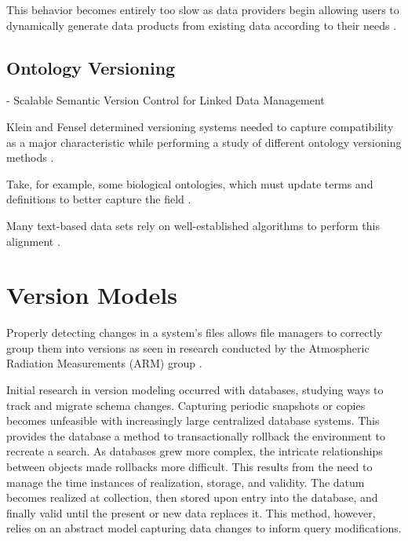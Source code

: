 This behavior becomes entirely too slow as data providers begin allowing users to dynamically generate data products from existing data according to their needs \cite{Barkstrom2003a}.

\subsection{Ontology Versioning}

\cite{HauptmannEtAl:LDQ2015} \cite{LDQ2015} - Scalable Semantic Version Control for Linked Data Management

Klein and Fensel determined versioning systems needed to capture compatibility as a major characteristic while performing a study of different ontology versioning methods \cite{Klein01ontologyversioning}.

Take, for example, some biological ontologies, which must update terms and definitions to better capture the field \cite{Ochs:2015:SVS:2826733.2826866}.

Many text-based data sets rely on well-established algorithms to perform this alignment  \cite{Hartung201315}.

\section{Version Models} \label{sec:models}

Properly detecting changes in a system's files allows file managers to correctly group them into versions as seen in research conducted by the Atmospheric Radiation Measurements (ARM) group \cite{6906868}.

Initial research in version modeling occurred with databases, studying ways to track and migrate schema changes.
Capturing periodic snapshots or copies becomes unfeasible with increasingly large centralized database systems.
This provides the database a method to transactionally rollback the environment to recreate a search.
As databases grew more complex, the intricate relationships between objects made rollbacks more difficult.
This results from the need to manage the time instances of realization, storage, and validity.
The datum becomes realized at collection, then stored upon entry into the database, and finally valid until the present or new data replaces it.
This method, however, relies on an abstract model capturing data changes to inform query modifications.

